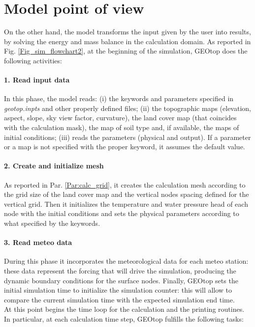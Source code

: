 \section{Model point of view}
 On the other hand, the model transforms the input given by the user into results, by solving the energy and mass balance in the calculation domain. As reported in Fig. \ref{Fig_sim_flowchart2}, at the beginning of the simulation, GEOtop does the following activities: 
\paragraph{1. Read input data} In this phase, the model reads: (i) the keywords and parameters specified in {\it geotop.inpts} and other properly defined files; (ii) the topographic maps (elevation, aspect, slope, sky view factor, curvature), the land cover map (that coincides with the calculation mask), the map of soil type and, if available, the maps of initial conditions; (iii) reads the parameters (physical and output). If a parameter or a map is not specified with the proper keyword, it assumes the default value.

\paragraph{2. Create and initialize mesh} As reported in Par. \ref{Par:calc_grid}, it creates the calculation mesh according to the grid size of the land cover map and the vertical nodes spacing defined for the vertical grid. Then it initializes the temperature and water pressure head of each node with the initial conditions and sets the physical parameters according to what specified by the keywords. 

\paragraph{3. Read meteo data} During this phase it incorporates the meteorological data for each meteo station: these data represent the forcing that will drive the simulation, producing the dynamic boundary conditions for the surface nodes. Finally, GEOtop sets the initial simulation time to initialize the simulation counter: this will allow to compare the current simulation time with the expected simulation end time. \\

\noindent At this point begins the time loop for the calculation and the printing routines. In particular, at each calculation time step, GEOtop fulfills the following tasks:
